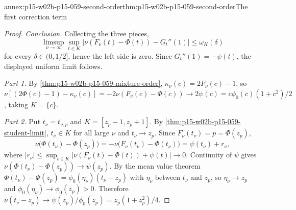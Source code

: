 \begin{annexitem}{annex:p15-w02b-p15-059-second-order}{thm:p15-w02b-p15-059-second-order}{The first correction term}
\begin{proof}
\emph{Conclusion.} Collecting the three pieces,
\[
 \limsup_{\nu\to\infty}\sup_{t\in K}
 \bigl|\nu(F_\nu(t)-\Phi(t))-G_t''(1)\bigr|\leq\omega_K(\delta)
\]
for every \(\delta\in(0,1/2]\), hence the left side is zero.
Since \(G_t''(1)=-\psi(t)\), the displayed uniform limit follows.

\emph{Part 1.} By \cref{thm:p15-w02b-p15-059-mixture-order},
\(\kappa_\nu(c)=2F_\nu(c)-1\), so
\(\nu[(2\Phi(c)-1)-\kappa_\nu(c)]=-2\nu(F_\nu(c)-\Phi(c))\to2\psi(c)
=c\phi_0(c)(1+c^2)/2\), taking \(K=\{c\}\).

\emph{Part 2.} Put \(t_\nu=t_{\nu,p}\) and \(K=[z_p-1,z_p+1]\). By
\cref{thm:p15-w02b-p15-059-student-limit}, \(t_\nu\in K\) for all large
\(\nu\) and \(t_\nu\to z_p\). Since \(F_\nu(t_\nu)=p=\Phi(z_p)\),
\[
 \nu\bigl(\Phi(t_\nu)-\Phi(z_p)\bigr)=-\nu\bigl(F_\nu(t_\nu)-\Phi(t_\nu)\bigr)
 =\psi(t_\nu)+r_\nu,
\]
where \(|r_\nu|\leq\sup_{t\in K}|\nu(F_\nu(t)-\Phi(t))+\psi(t)|\to0\).
Continuity of \(\psi\) gives
\(\nu(\Phi(t_\nu)-\Phi(z_p))\to\psi(z_p)\). By the mean value theorem
\(\Phi(t_\nu)-\Phi(z_p)=\phi_0(\eta_\nu)(t_\nu-z_p)\) with \(\eta_\nu\)
between \(t_\nu\) and \(z_p\), so \(\eta_\nu\to z_p\) and
\(\phi_0(\eta_\nu)\to\phi_0(z_p)>0\). Therefore
\(\nu(t_\nu-z_p)\to\psi(z_p)/\phi_0(z_p)=z_p(1+z_p^2)/4\).
\end{proof}
\end{annexitem}

